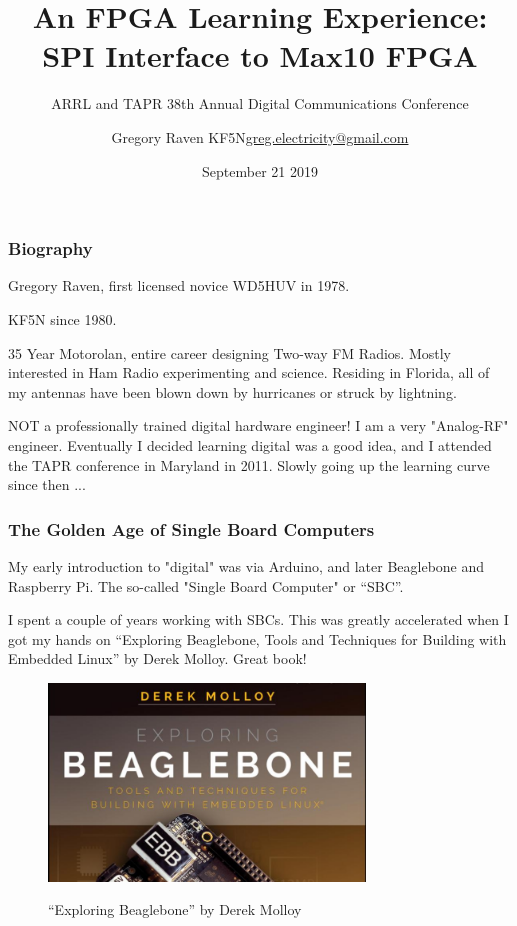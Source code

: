 \documentclass{beamer}
\title{An FPGA Learning Experience: SPI Interface to Max10 FPGA}
\subtitle{ARRL and TAPR 38th Annual Digital Communications Conference}
\author{\texorpdfstring{Gregory Raven KF5N\newline\url{greg.electricity@gmail.com}}{Author}}
\date{September 21 2019}
\begin{document}
	
	\frame{\titlepage}
	
	\begin{frame}
	\frametitle{Biography}
	Gregory Raven, first licensed novice WD5HUV in 1978.
	
	KF5N since 1980.
	
	35 Year Motorolan, entire career designing Two-way FM Radios.
	Mostly interested in Ham Radio experimenting and science.
	Residing in Florida, all of my antennas have been blown down by hurricanes or struck by lightning.
	
	NOT a professionally trained digital hardware engineer!  I am a very "Analog-RF" engineer.
	Eventually I decided learning digital was a good idea, and I attended the TAPR conference in Maryland in 2011.  Slowly going up the learning curve since then ...
\end{frame}

	\begin{frame}
	\frametitle{The Golden Age of Single Board Computers}
	
	My early introduction to "digital" was via Arduino, and later Beaglebone and Raspberry Pi.
	The so-called "Single Board Computer" or ``SBC''.
	
	I spent a couple of years working with SBCs.  This was greatly accelerated when I got my hands on ``Exploring Beaglebone, Tools and Techniques for Building with Embedded Linux'' by Derek Molloy.  Great book!
	
	\begin{figure}[h]
		\centering
		\includegraphics[width=0.75\textwidth]{graphics/beaglebone.png}
		\centering\bfseries
		\caption{``Exploring Beaglebone'' by Derek Molloy}
	\end{figure}
	
\end{frame}
\end{document}
